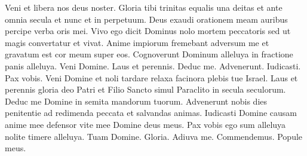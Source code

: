 \begin{multicols*}{2}
 Veni et libera nos deus noster.
 Gloria tibi trinitas equalis una deitas et ante omnia secula et nunc et in perpetuum.
 Deus exaudi orationem meam auribus percipe verba oris mei.
 Vivo ego dicit Dominus nolo mortem peccatoris sed ut magis convertatur et vivat.
 Anime impiorum fremebant adversum me et gravatum est cor meum super eos.
 Cognoverunt Dominum alleluya in fractione panis alleluya.
 Veni Domine.
 Laus et perennis.
 Deduc me.
 Advenerunt.
 Iudicasti.
 Pax vobis.
 Veni Domine et noli tardare relaxa facinora plebis tue Israel.
 Laus et perennis gloria deo Patri et Filio Sancto simul Paraclito in secula seculorum.
 Deduc me Domine in semita mandorum tuorum.
 Advenerunt nobis dies penitentie ad redimenda peccata et salvandas animas.
 Iudicasti Domine causam anime mee defensor vite mee Domine deus meus.
 Pax vobis ego sum alleluya nolite timere alleluya.
 Tuam Domine.
 Gloria.
 Adiuva me.
 Commendemus.
 Popule meus.

\end{multicols*}
